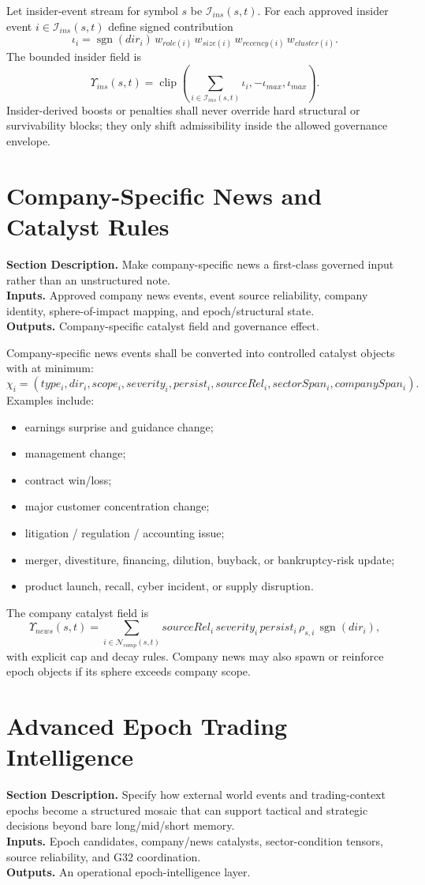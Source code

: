 \documentclass[11pt]{report}
\newcommand{\clip}{\operatorname{clip}}
\newcommand{\meta}[3]{\textbf{Section Description.} #1\\
\textbf{Inputs.} #2\\
\textbf{Outputs.} #3\par}
\begin{document}
Let insider-event stream for symbol $s$ be $\mathcal{I}_{ins}(s,t)$. For each approved insider event $i\in\mathcal{I}_{ins}(s,t)$ define signed contribution
\[
\iota_i = \operatorname{sgn}(dir_i)\,w_{role(i)}\,w_{size(i)}\,w_{recency(i)}\,w_{cluster(i)}.
\]
The bounded insider field is
\[
\Upsilon_{ins}(s,t)=\clip\!\left(\sum_{i\in\mathcal{I}_{ins}(s,t)} \iota_i,-\iota_{max},\iota_{max}\right).
\]
Insider-derived boosts or penalties shall never override hard structural or survivability blocks; they only shift admissibility inside the allowed governance envelope.

\section{Company-Specific News and Catalyst Rules}
\meta{Make company-specific news a first-class governed input rather than an unstructured note.}{Approved company news events, event source reliability, company identity, sphere-of-impact mapping, and epoch/structural state.}{Company-specific catalyst field and governance effect.}

Company-specific news events shall be converted into controlled catalyst objects with at minimum:
\[
\chi_i=(type_i,dir_i,scope_i,severity_i,persist_i,sourceRel_i,sectorSpan_i,companySpan_i).
\]
Examples include:
\begin{itemize}
    \item earnings surprise and guidance change;
    \item management change;
    \item contract win/loss;
    \item major customer concentration change;
    \item litigation / regulation / accounting issue;
    \item merger, divestiture, financing, dilution, buyback, or bankruptcy-risk update;
    \item product launch, recall, cyber incident, or supply disruption.
\end{itemize}
The company catalyst field is
\[
\Upsilon_{news}(s,t)=\sum_{i\in\mathcal{N}_{comp}(s,t)} sourceRel_i\,severity_i\,persist_i\,\rho_{s,i}\,\operatorname{sgn}(dir_i),
\]
with explicit cap and decay rules. Company news may also spawn or reinforce epoch objects if its sphere exceeds company scope.

\section{Advanced Epoch Trading Intelligence}
\meta{Specify how external world events and trading-context epochs become a structured mosaic that can support tactical and strategic decisions beyond bare long/mid/short memory.}{Epoch candidates, company/news catalysts, sector-condition tensors, source reliability, and G32 coordination.}{An operational epoch-intelligence layer.}
\end{document}
